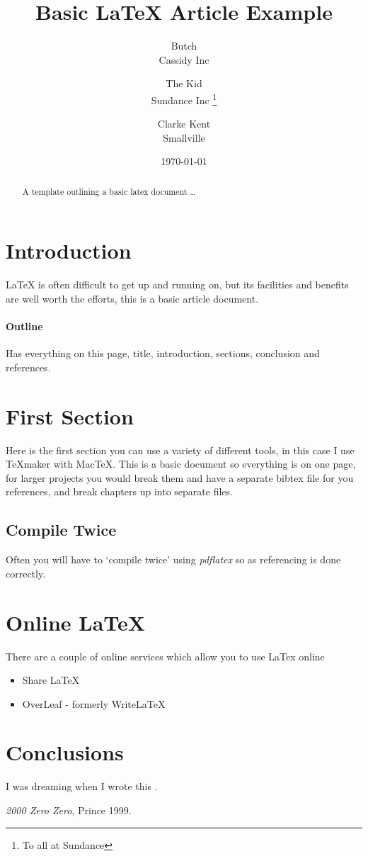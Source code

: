 \documentclass{article}
\title{Basic \LaTeX{} Article Example}
\author{Butch  \\
	Cassidy Inc  \\
	\and 
	The Kid \\
	Sundance Inc \thanks{To all at Sundance}\\
	\and 
	Clarke Kent\\
	Smallville\\
	}
\date{\today}
\begin{document}
\maketitle

\begin{abstract}
A template outlining a basic latex document \ldots 
\end{abstract}

\section{Introduction}
\LaTeX{} is often difficult to get up and running on, but its facilities and benefits are well worth the efforts, this is a basic article document.

\paragraph{Outline}
Has everything on this page, title, introduction, sections, conclusion and references.

\newpage   

\section{First Section}
Here is the first section you can use a variety of different tools, in this case I use TeXmaker with MacTeX. This is a basic document so everything is on one page, for larger projects you would break them and have a separate bibtex file for you references, and break chapters up into separate files.

\subsection{Compile Twice}
Often you will have to `compile twice' using \textit{pdflatex} so as referencing is done correctly.

\section{Online LaTeX}
There are a couple of online services which allow you to use LaTex online
\begin{itemize}
\item Share LaTeX
\item OverLeaf - formerly WriteLaTeX
\end{itemize}

\section{Conclusions}\label{conclusions}
I was dreaming when I wrote this \cite{prince}.

\begin{thebibliography}{9}
 \emph{2000 Zero Zero},
Prince 1999. 
\end{thebibliography}
\end{document}
